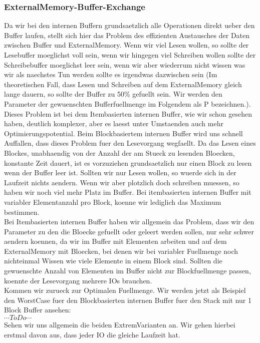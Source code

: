 \documentclass[10pt,a4paper]{article}
\begin{document}
\subsubsection{ExternalMemory-Buffer-Exchange}
Da wir bei den internen Buffern grundsaetzlich alle Operationen direkt ueber den Buffer laufen, stellt sich hier das Problem des effizienten Austausches der Daten zwischen Buffer und ExternalMemory. Wenn wir viel Lesen wollen, so sollte der Lesebuffer moeglichst voll sein, wenn wir hingegen viel Schreiben wollen sollte der Schreibebuffer moeglichst leer sein, wenn wir aber wiederrum nicht wissen was wir als naechstes Tun werden sollte es irgendwas dazwischen sein (Im theoretischen Fall, dass Lesen und Schreiben auf dem ExternalMemory gleich lange dauern, so sollte der Buffer zu 50\% gefuellt sein. Wir werden den Parameter der gewuenschten Bufferfuellmenge im Folgendem als P bezeichnen.). Dieses Problem ist bei dem Itembasierten internen Buffer, wie wir schon gesehen haben, deutlich komplexer, aber es laesst unter Umstaenden auch mehr Optimierungspotential. Beim Blockbasiertem internen Buffer wird uns schnell Auffallen, dass dieses Problem fuer den Lesevorgang wegfaellt. Da das Lesen eines Blockes, unabhaendig von der Anzahl der am Stueck zu lesenden Bloecken, konstante Zeit dauert, ist es vorzuziehen grundsaetzlich nur einen Block zu lesen wenn der Buffer leer ist. Sollten wir nur Lesen wollen, so wuerde sich in der Laufzeit nichts aendern. Wenn wir aber plotzlich doch schreiben muessen, so haben wir noch viel mehr Platz im Buffer. Bei itembasierten internen Buffer mit variabler Elementanzahl pro Block, koenne wir lediglich das Maximum bestimmen.\\
Bei Itembasierten internen Buffer haben wir allgemein das Problem, dass wir den Parameter zu den die Bloecke gefuellt oder geleert werden sollen, nur sehr schwer aendern koennen, da wir im Buffer mit Elementen arbeiten und auf dem ExternalMemory mit Bloecken, bei denen wir bei variabler Fuellmenge noch nichteinmal Wissen wie viele Elemente in einem Block sind. Sollten die gewuenschte Anzahl von Elementen im Buffer nicht zur Blockfuellmenge passen, koennte der Lesevorgang mehrere IOs brauchen.\\
Kommen wir zurueck zur Optimalen Fuellmenge. Wir werden jetzt als Beispiel den WorstCase fuer den Blockbasierten internen Buffer fuer den Stack mit nur 1 Block Buffer ansehen:\\
$\cdots ToDo \cdots$\\
Sehen wir uns allgemein die beiden ExtremVarianten an. Wir gehen hierbei erstmal davon aus, dass jeder IO die gleiche Laufzeit hat.
\end{document}
